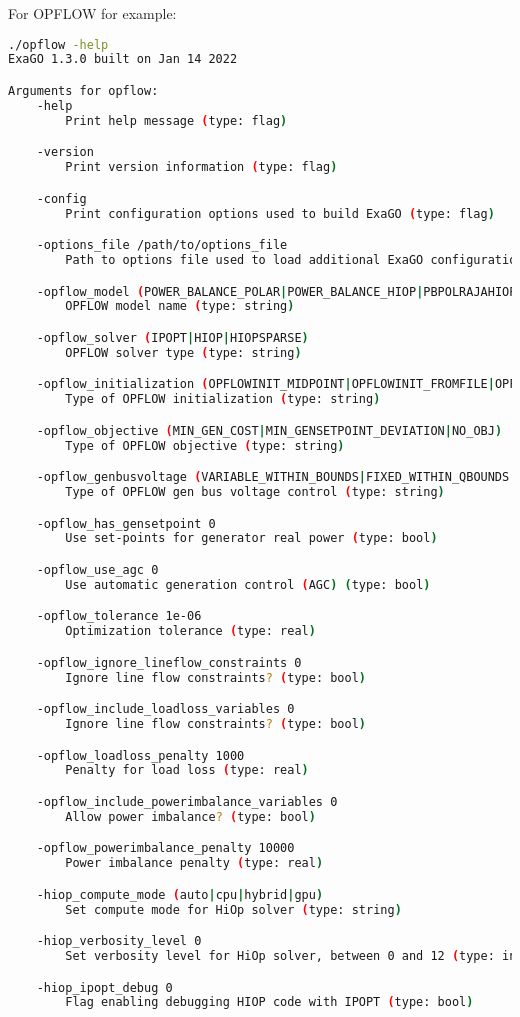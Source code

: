 For OPFLOW for example:
\begin{lstlisting}[language=bash]
./opflow -help
ExaGO 1.3.0 built on Jan 14 2022

Arguments for opflow:
	-help
		Print help message (type: flag)

	-version
		Print version information (type: flag)

	-config
		Print configuration options used to build ExaGO (type: flag)

	-options_file /path/to/options_file
		Path to options file used to load additional ExaGO configuration options (type: string)

	-opflow_model (POWER_BALANCE_POLAR|POWER_BALANCE_HIOP|PBPOLRAJAHIOP)
		OPFLOW model name (type: string)

	-opflow_solver (IPOPT|HIOP|HIOPSPARSE)
		OPFLOW solver type (type: string)

	-opflow_initialization (OPFLOWINIT_MIDPOINT|OPFLOWINIT_FROMFILE|OPFLOWINIT_ACPF|OPFLOWINIT_FLATSTART)
		Type of OPFLOW initialization (type: string)

	-opflow_objective (MIN_GEN_COST|MIN_GENSETPOINT_DEVIATION|NO_OBJ)
		Type of OPFLOW objective (type: string)

	-opflow_genbusvoltage (VARIABLE_WITHIN_BOUNDS|FIXED_WITHIN_QBOUNDS|FIXED_AT_SETPOINT)
		Type of OPFLOW gen bus voltage control (type: string)

	-opflow_has_gensetpoint 0
		Use set-points for generator real power (type: bool)

	-opflow_use_agc 0
		Use automatic generation control (AGC) (type: bool)

	-opflow_tolerance 1e-06
		Optimization tolerance (type: real)

	-opflow_ignore_lineflow_constraints 0
		Ignore line flow constraints? (type: bool)

	-opflow_include_loadloss_variables 0
		Ignore line flow constraints? (type: bool)

	-opflow_loadloss_penalty 1000
		Penalty for load loss (type: real)

	-opflow_include_powerimbalance_variables 0
		Allow power imbalance? (type: bool)

	-opflow_powerimbalance_penalty 10000
		Power imbalance penalty (type: real)

	-hiop_compute_mode (auto|cpu|hybrid|gpu)
		Set compute mode for HiOp solver (type: string)

	-hiop_verbosity_level 0
		Set verbosity level for HiOp solver, between 0 and 12 (type: int)

	-hiop_ipopt_debug 0
		Flag enabling debugging HIOP code with IPOPT (type: bool)
\end{lstlisting}

